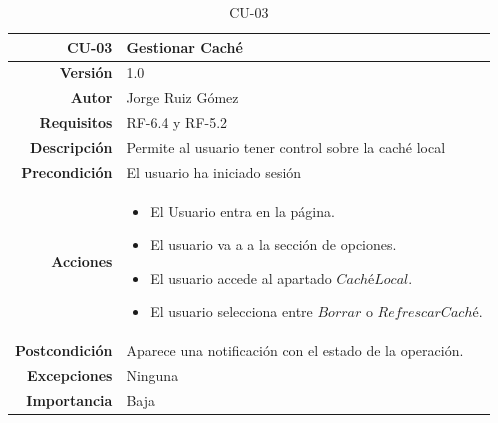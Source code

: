 \begin{table}[H]
    \centering
    \begin{tabular}{r|p{}}
    \hline
    \textbf{CU-03}         & \textbf{Gestionar Caché}                                 \\ \hline
    \textbf{Versión}       & 1.0                                                     \\
    \textbf{Autor}         & Jorge Ruiz Gómez                                        \\
    \textbf{Requisitos}    & RF-6.4 y RF-5.2                                       \\
    \textbf{Descripción}   & Permite al usuario tener control sobre la caché local \\ \hline
    \textbf{Precondición}  & El usuario ha iniciado sesión                                                 \\
    \textbf{Acciones}      &    \begin{itemize}
                                    \item El Usuario entra en la página.
                                    \item El usuario va a a la sección de opciones.
                                    \item El usuario accede al apartado $Caché Local$.
                                    \item El usuario selecciona entre $Borrar$ o $Refrescar Caché$. 
                                \end{itemize}\\
                                                                              
    \textbf{Postcondición} & Aparece una notificación con el estado de la operación.\\
    \textbf{Excepciones}   & Ninguna                                                 \\
    \textbf{Importancia}   & Baja                                                    \\ \hline
    \end{tabular}
    \caption{CU-03}
    \label{tab:CUT-03}
\end{table}

